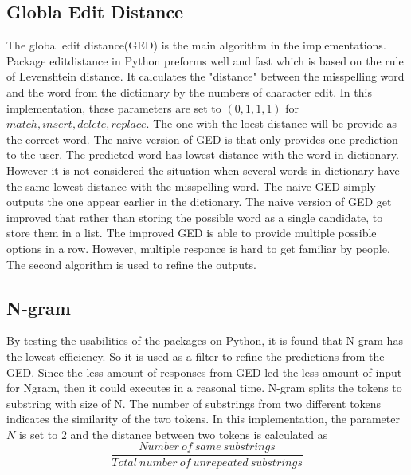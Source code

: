 \documentclass[11pt]{article}
\begin{document}
\subsection{Globla Edit Distance}
The global edit distance(GED) is the main algorithm in the implementations. Package editdistance in Python preforms well and fast which is based on the rule of Levenshtein distance. It calculates the "distance" between the misspelling word and the word from the dictionary by the numbers of character edit. In this implementation, these parameters are set to $(0, 1, 1, 1)$ for $match, insert, delete, replace$. The one with the loest distance will be provide as the correct word. The naive version of GED is that only provides one prediction to the user. The predicted word has lowest distance with the word in dictionary. However it is not considered the situation when several words in dictionary have the same lowest distance with the misspelling word. The naive GED simply outputs the one appear earlier in the dictionary. The naive version of GED get improved that rather than storing the possible word as a single candidate, to store them in a list. The improved GED is able to provide multiple possible options in a row. However, multiple responce is hard to get familiar by people. The second algorithm is used to refine the outputs.

\subsection{N-gram}
By testing the usabilities of the packages on Python, it is found that N-gram has the lowest efficiency. So it is used as a filter to refine the predictions from the GED. Since the less amount of responses from GED led the less amount of input for Ngram, then it could executes in a reasonal time. N-gram splits the tokens to substring with size of N. The number of substrings from two different tokens indicates the similarity of the two tokens. In this implementation, the parameter $N$ is set to $2$ and the distance between two tokens is calculated as 
\[\frac{Number\ of\ same\ substrings}{Total\ number\ of\ unrepeated\ substrings}\]
\end{document}
